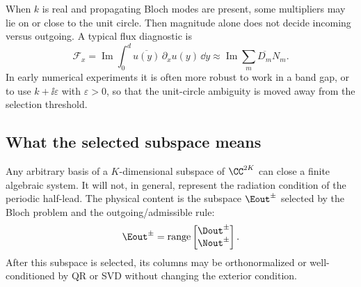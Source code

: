 When \(k\) is real and propagating Bloch modes are present, some multipliers may
lie on or close to the unit circle.  Then magnitude alone does not decide
incoming versus outgoing.  A typical flux diagnostic is
\[
  \mathcal F_x
  =
  \operatorname{Im}\int_0^d \overline{u(y)}\,\partial_xu(y)\,\dd y
  \approx
  \operatorname{Im}\sum_m \overline{D_m}N_m .
\]
In early numerical experiments it is often more robust to work in a band gap, or
to use \(k+\ii\varepsilon\) with \(\varepsilon>0\), so that the unit-circle
ambiguity is moved away from the selection threshold.

\subsection{What the selected subspace means}

Any arbitrary basis of a \(K\)-dimensional subspace of \(\CC^{2K}\) can close a
finite algebraic system.  It will not, in general, represent the radiation
condition of the periodic half-lead.  The physical content is the subspace
\(\Eout^\pm\) selected by the Bloch problem and the outgoing/admissible rule:
\[
  \Eout^\pm
  =
  \operatorname{range}
  \begin{bmatrix}
  \Dout^\pm\\
  \Nout^\pm
  \end{bmatrix}.
\]
After this subspace is selected, its columns may be orthonormalized or
well-conditioned by QR or SVD without changing the exterior condition.
